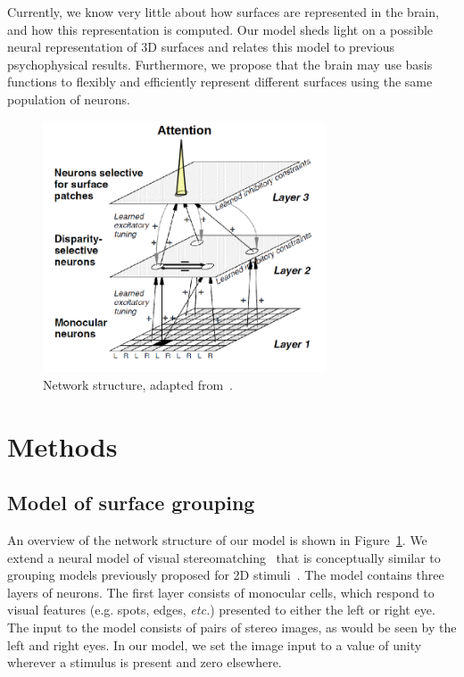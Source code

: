 Currently, we know very little about how surfaces are represented in the brain, and how this representation is computed. Our model sheds light on a possible neural representation of 3D surfaces and relates this model to previous psychophysical results. Furthermore, we propose that the brain may use basis functions to flexibly and efficiently represent different surfaces using the same population of neurons.

\begin{figure}[t]
\centering
\includegraphics[width=0.75\textwidth]{3D-Surface/figs/groupingcircuit}
\makeatletter
\let\@currsize\normalsize
\caption[3D surface grouping model network]{Network structure, adapted from~\citet{Marshall_etal96}.}
\label{NetworkStructure}
\end{figure}

\section{Methods}

\subsection{Model of surface grouping}

An overview of the network structure of our model is shown in
Figure~\ref{NetworkStructure}. We extend a neural model of visual
stereomatching~\citep{Marshall_etal96} that is conceptually similar to
grouping models previously proposed for 2D stimuli~\citep{Craft_etal07, Mihalas_etal11b, Russell_etal14}. The model contains three layers of neurons. The first layer consists of monocular cells, which respond to visual features (e.g. spots, edges, {\em etc.}) presented to either the left or right eye. The input to the model consists of pairs of stereo images, as would be seen by the left and right eyes. In our model, we set the image input to a value of unity wherever a stimulus is present and zero elsewhere.

